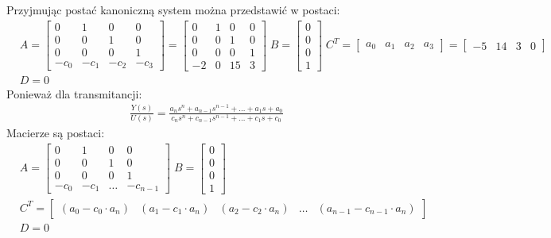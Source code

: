 \documentclass[a4paper,11pt]{article}
\begin{document}
Przyjmując postać kanoniczną system można przedstawić w postaci:
\begin{align*}
&A = 
\begin{bmatrix}
0 & 1 & 0 & 0 \\
0 & 0 & 1 & 0 \\
0 & 0 & 0 & 1 \\
-c_0 & -c_1 & -c_2 & -c_3
\end{bmatrix}
=
\begin{bmatrix}
0 & 1 & 0 & 0 \\
0 & 0 & 1 & 0 \\
0 & 0 & 0 & 1 \\
-2 & 0 & 15 & 3
\end{bmatrix}
\;
B = \begin{bmatrix}
0 \\
0 \\
0 \\ 
1
\end{bmatrix}
\;
C^T = 
\begin{bmatrix}
a_0 & a_1 & a_2 & a_3
\end{bmatrix}
=
\begin{bmatrix}
-5 & 14 & 3 & 0  
\end{bmatrix} \\
& D = 0
\end{align*}
Ponieważ dla transmitancji:
\begin{align*}
\frac{Y(s)}{U(s)}=\frac{a_ns^n+a_{n-1}s^{n-1}+\dots + a_1s + a_0}{c_ns^n+c_{n-1}s^{n-1}+\dots + c_1s + c_0}
\end{align*}
Macierze są postaci:
\begin{align*}
&A = 
\begin{bmatrix}
0 & 1 & 0 & 0 \\
0 & 0 & 1 & 0 \\
0 & 0 & 0 & 1 \\
-c_0 & -c_1 & \dots & -c_{n-1}
\end{bmatrix}
\;
B = \begin{bmatrix}
0 \\
0 \\
0 \\ 
1
\end{bmatrix}
 \\
&C^T = 
\begin{bmatrix}
(a_0-c_0\cdot a_n)& (a_1-c_1\cdot a_n) & (a_2-c_2\cdot a_n) & \dots & (a_{n-1}-c_{n-1}\cdot a_n )
\end{bmatrix}
\\
& D = 0
\end{align*}
\end{document}
